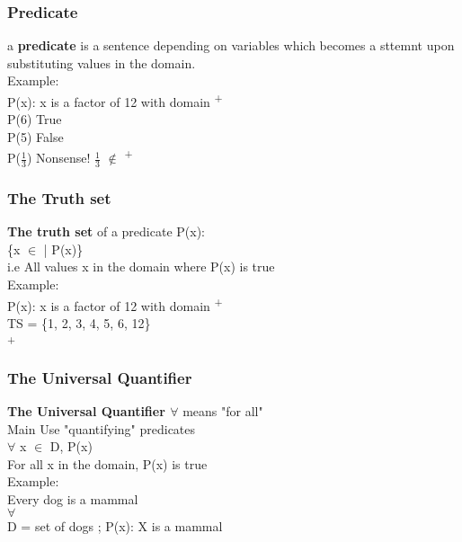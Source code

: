 \documentclass[11pt]{article}
\begin{document}
\subsubsection{Predicate}
\label{sec:org9f44c03}
a \textbf{predicate} is a sentence depending on variables which becomes a sttemnt upon substituting values in the domain.\\

Example:\\
P(x): x is a factor of 12 with domain \textsuperscript{+}\\

P(6) True\\
P(5) False\\
P(\(\frac{1}{3}\)) Nonsense! \(\frac{1}{3}\) \(\notin\) \textsuperscript{+}\\

\subsubsection{The Truth set}
\label{sec:orgc5eee3d}
\textbf{The truth set} of a predicate P(x):\\
\{x \(\in\)  | P(x)\}\\
i.e All values x in the domain where P(x) is true\\

Example:\\
P(x): x is a factor of 12 with domain \textsuperscript{+}\\
TS = \{1, 2, 3, 4, 5, 6, 12\}\\
\subseteq {}\textsuperscript{+}\\

\subsubsection{The Universal Quantifier}
\label{sec:orgcffc8b6}
\textbf{The Universal Quantifier \(\forall\)} means "for all"\\

Main Use "quantifying" predicates\\
\(\forall\) x \(\in\) D, P(x)\\
For all x in the domain, P(x) is true\\

Example:\\
Every dog is a mammal\\
\(\forall\)\\
D = set of dogs ; P(x): X is a mammal\\
\end{document}
